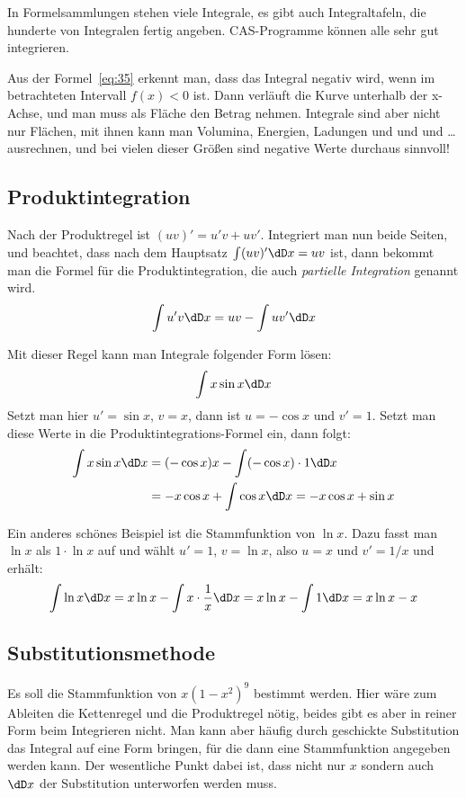 In Formelsammlungen stehen viele Integrale, es gibt auch Integraltafeln, die
hunderte von Integralen fertig angeben. CAS-Programme können alle sehr gut
integrieren.

Aus der Formel~\eqref{eq:35} erkennt man, dass das Integral negativ wird, wenn
im betrachteten Intervall $f(x)<0$ ist. Dann verläuft die Kurve unterhalb der
x-Achse, und man muss als Fläche den Betrag nehmen. Integrale sind aber nicht
nur Flächen, mit ihnen kann man Volumina, Energien, Ladungen und und und
\ldots ausrechnen, und bei vielen dieser Größen sind negative Werte durchaus
sinnvoll!

\subsection{Produktintegration}
Nach der Produktregel ist $(uv)'=u'v+uv'$. Integriert man nun beide Seiten,
und beachtet, dass nach dem Hauptsatz $\int (uv)'\dD x=uv$ ist, dann bekommt
man die Formel für die Produktintegration, die auch \emph{partielle
  Integration} genannt wird.
\begin{equation}
  \label{eq:42}
  \int u'v\dD x= uv - \int uv'\dD x
\end{equation}

Mit dieser Regel kann man \zB Integrale folgender Form lösen:
\[
\int x\sin x\dD x
\]
Setzt man hier $u'=\sin x$, $v=x$, dann ist $u=-\cos x$ und $v'=1$. Setzt man
diese Werte in die Produktintegrations-Formel ein, dann folgt:
\begin{align*}
\int x\sin x\dD x&= (-\cos x)x-\int (-\cos x)\cdot1\dD x\\
&=-x\cos x+\int\cos x\dD x= -x\cos x+\sin x
\end{align*}

Ein anderes schönes Beispiel ist die Stammfunktion von $\ln x$. Dazu fasst man
$\ln x$ als $1\cdot\ln x$ auf und wählt $u'=1$, $v=\ln x$, also $u=x$ und
$v'=1/x$ und erhält:
\[
\int\ln x\dD x=x\ln x-\int x\cdot\frac{1}{x}\dD x=
x\ln x-\int 1\dD x=x\ln x -x
\]

\subsection{Substitutionsmethode}
Es soll die Stammfunktion von $x(1-x^2)^9$ bestimmt werden. Hier wäre zum
Ableiten die Kettenregel und die Produktregel nötig, beides gibt es aber in
reiner Form beim Integrieren nicht. Man kann aber häufig durch geschickte
Substitution das Integral auf eine Form bringen, für die dann eine
Stammfunktion angegeben werden kann. Der wesentliche Punkt dabei ist, dass
nicht nur $x$ sondern auch $\dD x$ der Substitution unterworfen werden muss.

